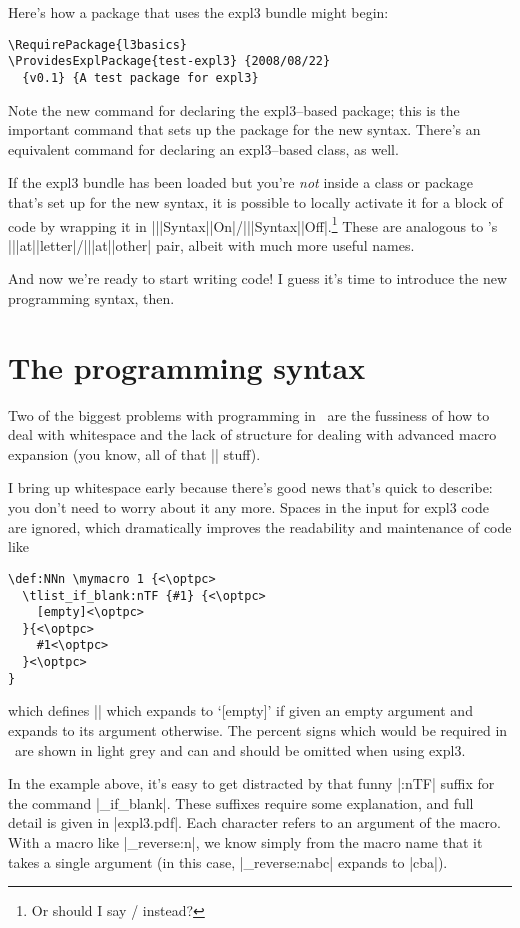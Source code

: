 \documentclass[final]{ltugboat}
\def\pkg#1{\textsf{#1}}
\begin{document}
Here's how a package that uses the \pkg{expl3} bundle might begin:
\begin{lstlisting}
\RequirePackage{l3basics}
\ProvidesExplPackage{test-expl3} {2008/08/22}
  {v0.1} {A test package for expl3}
\end{lstlisting}
Note the new command for declaring the \pkg{expl3}--based package; this is the important command that sets up the package for the new syntax. There's an equivalent command for declaring an \pkg{expl3}--based class, as well.

If the \pkg{expl3} bundle has been loaded but you're \emph{not} inside a class or package that's set up for the new syntax, it is possible to locally activate it for a block of code by wrapping it in |\Expl|\-|Syntax|\-|On|/|\Expl|\-|Syntax|\-|Off|.\footnote{Or should I say \texttt{\string\CodeStart}/\texttt{\string\CodeStop} instead?} These are analogous to \LaTeXe's |\make|\-|at|\-|letter|/|\make|\-|at|\-|other| pair, albeit with much more useful names.

And now we're ready to start writing code! I guess it's time to introduce the new programming syntax, then.

\section{The programming syntax}

Two of the biggest problems with programming in \LaTeXe\ are the fussiness of how to deal with whitespace and the lack of structure for dealing with advanced macro expansion (you know, all of that |\expandafter| stuff).

I bring up whitespace early because there's good news that's quick to describe: you don't need to worry about it any more. Spaces in the input for \pkg{expl3} code are ignored, which dramatically improves the readability and maintenance of code like
\def\optpc{\textcolor[gray]{0.7}{\%}}
\begin{lstlisting}[escapeinside=<>]
\def:NNn \mymacro 1 {<\optpc>
  \tlist_if_blank:nTF {#1} {<\optpc>
    [empty]<\optpc>
  }{<\optpc>
    #1<\optpc>
  }<\optpc>
}
\end{lstlisting}
which defines |\mymacro| which expands to `[empty]' if given an empty argument and expands to its argument otherwise. The percent signs which would be required in \LaTeXe\ are shown in light grey and can and should be omitted when using \pkg{expl3}.

In the example above, it's easy to get distracted by that funny |:nTF| suffix for the command |\tlist_if_blank|. These suffixes require some explanation, and full detail is given in |expl3.pdf|. Each character refers to an argument of the macro. With a macro like |\tlist_reverse:n|, we know simply from the macro name that it takes a single argument (in this case, |\tlist_reverse:n{abc}| expands to |cba|).
\end{document}
